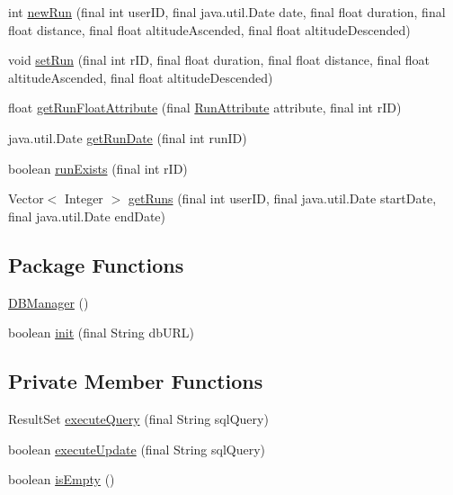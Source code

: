 \begin{DoxyCompactItemize}
\item 
int \mbox{\hyperlink{classcom_1_1activitytracker_1_1_d_b_manager_ae0504a939b6f165aa5c3cca9eb8df049}{new\+Run}} (final int user\+ID, final java.\+util.\+Date date, final float duration, final float distance, final float altitude\+Ascended, final float altitude\+Descended)
\item 
void \mbox{\hyperlink{classcom_1_1activitytracker_1_1_d_b_manager_aa088e156858d8d661e2f43c1054c51c8}{set\+Run}} (final int r\+ID, final float duration, final float distance, final float altitude\+Ascended, final float altitude\+Descended)
\item 
float \mbox{\hyperlink{classcom_1_1activitytracker_1_1_d_b_manager_a666452f1e5862f90c06b0beb9a9fcfdd}{get\+Run\+Float\+Attribute}} (final \mbox{\hyperlink{enumcom_1_1activitytracker_1_1_run_attribute}{Run\+Attribute}} attribute, final int r\+ID)
\item 
java.\+util.\+Date \mbox{\hyperlink{classcom_1_1activitytracker_1_1_d_b_manager_a1bef7a6f466db41b1a6da7a502d35bb9}{get\+Run\+Date}} (final int run\+ID)
\item 
boolean \mbox{\hyperlink{classcom_1_1activitytracker_1_1_d_b_manager_a723ac1c573bacdd0b62894357bd65a9b}{run\+Exists}} (final int r\+ID)
\item 
Vector$<$ Integer $>$ \mbox{\hyperlink{classcom_1_1activitytracker_1_1_d_b_manager_a48d9e51c1b73064b8f773cdde5113928}{get\+Runs}} (final int user\+ID, final java.\+util.\+Date start\+Date, final java.\+util.\+Date end\+Date)
\end{DoxyCompactItemize}
\subsection*{Package Functions}
\begin{DoxyCompactItemize}
\item 
\mbox{\hyperlink{classcom_1_1activitytracker_1_1_d_b_manager_ac1f558ef56fe02d74fe103a473a15bb5}{D\+B\+Manager}} ()
\item 
boolean \mbox{\hyperlink{classcom_1_1activitytracker_1_1_d_b_manager_a41df4600bb5901a26a4ea6a7108a70b9}{init}} (final String db\+U\+RL)
\end{DoxyCompactItemize}
\subsection*{Private Member Functions}
\begin{DoxyCompactItemize}
\item 
Result\+Set \mbox{\hyperlink{classcom_1_1activitytracker_1_1_d_b_manager_adef71a18dc05536d80e83311841e1953}{execute\+Query}} (final String sql\+Query)
\item 
boolean \mbox{\hyperlink{classcom_1_1activitytracker_1_1_d_b_manager_a382397e2bdf309901d1c80ff66be69b7}{execute\+Update}} (final String sql\+Query)
\item 
boolean \mbox{\hyperlink{classcom_1_1activitytracker_1_1_d_b_manager_af9ab112f840e3c803b6b28a2f1a15215}{is\+Empty}} ()
\end{DoxyCompactItemize}
